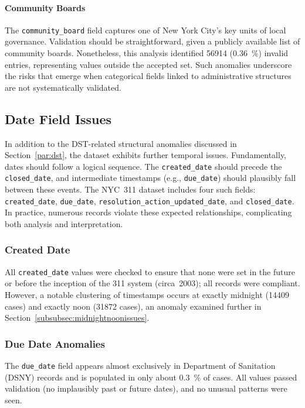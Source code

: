 \documentclass[linenumber]{jdsart}
\newcommand{\numint}[1]{\num[round-mode=none]{#1}}
\begin{document}
\paragraph{Community Boards}
\label{sec:communityboardissues}
The \texttt{community\_board} field captures one of New York City’s key units
of local governance. Validation should be straightforward, given a publicly
available list of community boards. Nonetheless, this analysis identified
\numint{56914} (\SI[round-precision = 2]{0.36}{\percent}) invalid entries, 
representing values outside the accepted set. Such
anomalies underscore the risks that emerge when categorical fields linked to
administrative structures are not systematically validated.


\subsection{Date Field Issues}
\label{subsec:datefieldissues}
In addition to the DST-related structural anomalies discussed in
Section~\ref{par:dst}, the dataset exhibits further temporal issues.
Fundamentally, dates should follow a logical sequence. The
\texttt{created\_date} should precede the \texttt{closed\_date}, and
intermediate timestamps (e.g., \texttt{due\_date}) should plausibly fall
between these events. The NYC~311 dataset includes four such fields:
\texttt{created\_date}, \texttt{due\_date}, \texttt{resolution\_action\_updated\_date}, and
\texttt{closed\_date}. In practice, numerous records violate these expected
relationships, complicating both analysis and interpretation.

\subsubsection{Created Date}
\label{subsubsec:createddate}
All \texttt{created\_date} values were checked to ensure that none were set in
the future or before the inception of the 311 system (circa~2003); all records
were compliant. However, a notable clustering of timestamps occurs at exactly
midnight (\numint{14409} cases) and exactly noon (\numint{31872} cases), an anomaly
examined further in Section~\ref{subsubsec:midnightnoonissues}.

\subsubsection{Due Date Anomalies}
\label{subsubsec:duedate}
The \texttt{due\_date} field appears almost exclusively in Department of
Sanitation (\textsc{DSNY}) records and is populated in only about
\SI[round-precision = 1]{0.3}{\percent} of cases. All values passed validation
(no implausibly past or future dates), and no unusual patterns were seen.
\end{document}
